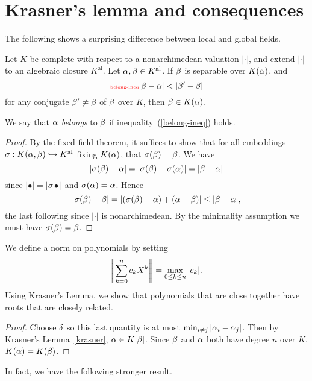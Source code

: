 \section{Krasner's lemma and consequences}
The following shows a surprising difference between local and global fields.
\begin{lem}
Let $K$ be complete with respect to a nonarchimedean valuation $|\cdot|$, and extend $|\cdot|$ to an algebraic closure $K^{\text{al}}$. Let $\alpha,\beta\in K^{\text{al}}$. If $\beta$ is separable over $K(\alpha)$, and
\begin{equation}\llabel{belong-ineq}
|\be-\al|<|\be'-\be|
\end{equation}
for any conjugate $\beta'\ne \beta$ of $\beta$ over $K$, then $\beta\in K(\alpha)$.
\end{lem}
We say that $\alpha$ {\it belongs} to $\beta$ if inequality~(\ref{belong-ineq}) holds.
\begin{proof}
By the fixed field theorem, it suffices to show that for all embeddings $\sigma:K(\alpha,\beta)\hookrightarrow K^{\text{al}}$ fixing $K(\alpha)$, that $\sigma(\beta)=\beta$. We have
\[
|\sigma(\beta)-\alpha|=|\sigma(\beta)-\sigma(\alpha)|=|\beta-\alpha|
\]
since $|\bullet|=|\sigma \bullet|$ and $\sigma(\alpha)=\alpha$. Hence
\[
|\sigma(\beta)-\beta|=|(\sigma(\beta)-\alpha)+(\alpha-\beta)|\le |\beta-\alpha|,
\]
the last following since $|\cdot|$ is nonarchimedean. By the minimality assumption we must have $\sigma(\beta)=\beta$.
\end{proof}
We define a norm on polynomials by setting
\[
\left\Vert {\sum_{k=0}^n c_kX^k}\right\Vert=\max_{0\le k\le n} |c_k|.
\]
Using Krasner's Lemma, we show that polynomials that are close together have roots that are closely related.
\begin{proof}
 Choose $\delta$ so this last quantity is at most $\min_{i\ne j} |\alpha_i-\alpha_j|$. Then by Krasner's Lemma~\ref{krasner}, $\alpha\in K[\beta]$. Since $\beta$ and $\alpha$ both have degree $n$ over $K$, $K(\alpha)=K(\beta)$.
\end{proof}
In fact, we have the following stronger result.
